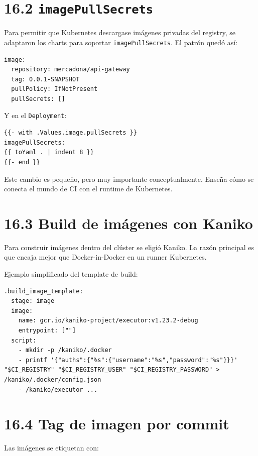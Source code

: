 \documentclass[
a4paper,
12pt]{report}
\begin{document}
\section{\texorpdfstring{16.2
\texttt{imagePullSecrets}}{16.2 imagePullSecrets}}\label{imagepullsecrets}

Para permitir que Kubernetes descargase imágenes privadas del registry,
se adaptaron los charts para soportar \texttt{imagePullSecrets}. El
patrón quedó así:

\begin{verbatim}
image:
  repository: mercadona/api-gateway
  tag: 0.0.1-SNAPSHOT
  pullPolicy: IfNotPresent
  pullSecrets: []
\end{verbatim}

Y en el \texttt{Deployment}:

\begin{verbatim}
{{- with .Values.image.pullSecrets }}
imagePullSecrets:
{{ toYaml . | indent 8 }}
{{- end }}
\end{verbatim}

Este cambio es pequeño, pero muy importante conceptualmente. Enseña cómo
se conecta el mundo de CI con el runtime de Kubernetes.

\section{16.3 Build de imágenes con
Kaniko}\label{build-de-imuxe1genes-con-kaniko}

Para construir imágenes dentro del clúster se eligió Kaniko. La razón
principal es que encaja mejor que Docker-in-Docker en un runner
Kubernetes.

Ejemplo simplificado del template de build:

\begin{verbatim}
.build_image_template:
  stage: image
  image:
    name: gcr.io/kaniko-project/executor:v1.23.2-debug
    entrypoint: [""]
  script:
    - mkdir -p /kaniko/.docker
    - printf '{"auths":{"%s":{"username":"%s","password":"%s"}}}' "$CI_REGISTRY" "$CI_REGISTRY_USER" "$CI_REGISTRY_PASSWORD" > /kaniko/.docker/config.json
    - /kaniko/executor ...
\end{verbatim}

\section{16.4 Tag de imagen por commit}\label{tag-de-imagen-por-commit}

Las imágenes se etiquetan con:
\end{document}
